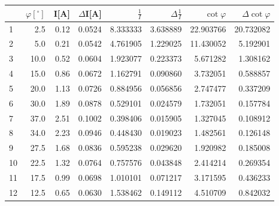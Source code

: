 \begin{tabular}{lrrrrrrr}
\toprule
{} &  $\varphi[^\circ]$ &  I[A] &  $\Delta$I[A] &  $\frac{1}{I}$ &  $\Delta \frac{1}{I}$ &  $\cot{\varphi}$ &  $\Delta \cot{\varphi}$ \\
\midrule
1  &                2.5 &  0.12 &        0.0524 &       8.333333 &              3.638889 &        22.903766 &               20.732082 \\
2  &                5.0 &  0.21 &        0.0542 &       4.761905 &              1.229025 &        11.430052 &                5.192901 \\
3  &               10.0 &  0.52 &        0.0604 &       1.923077 &              0.223373 &         5.671282 &                1.308162 \\
4  &               15.0 &  0.86 &        0.0672 &       1.162791 &              0.090860 &         3.732051 &                0.588857 \\
5  &               20.0 &  1.13 &        0.0726 &       0.884956 &              0.056856 &         2.747477 &                0.337209 \\
6  &               30.0 &  1.89 &        0.0878 &       0.529101 &              0.024579 &         1.732051 &                0.157784 \\
7  &               37.0 &  2.51 &        0.1002 &       0.398406 &              0.015905 &         1.327045 &                0.108912 \\
8  &               34.0 &  2.23 &        0.0946 &       0.448430 &              0.019023 &         1.482561 &                0.126148 \\
9  &               27.5 &  1.68 &        0.0836 &       0.595238 &              0.029620 &         1.920982 &                0.185008 \\
10  &               22.5 &  1.32 &        0.0764 &       0.757576 &              0.043848 &         2.414214 &                0.269354 \\
11 &               17.5 &  0.99 &        0.0698 &       1.010101 &              0.071217 &         3.171595 &                0.436233 \\
12 &               12.5 &  0.65 &        0.0630 &       1.538462 &              0.149112 &         4.510709 &                0.842032 \\
\bottomrule
\end{tabular}
